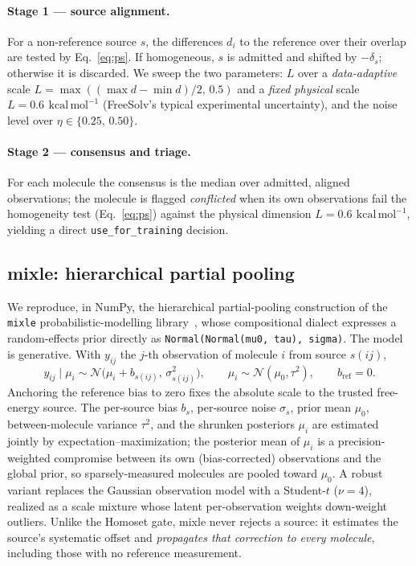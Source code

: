 \documentclass[11pt]{article}
\newcommand{\kcal}{\,\mathrm{kcal\,mol^{-1}}}
\begin{document}
\paragraph{Stage 1 --- source alignment.} For a non-reference source $s$, the differences
$d_i$ to the reference over their overlap are tested by Eq.~\eqref{eq:ps}. If homogeneous, $s$
is admitted and shifted by $-\delta_s$; otherwise it is discarded. We sweep the two parameters:
$L$ over a \emph{data-adaptive} scale $L=\max((\max d-\min d)/2,\,0.5)$ and a \emph{fixed
physical} scale $L=\SI{0.6}{\kcal}$ (FreeSolv's typical experimental uncertainty), and the noise
level over $\eta\in\{0.25,\,0.50\}$.

\paragraph{Stage 2 --- consensus and triage.} For each molecule the consensus is the median
over admitted, aligned observations; the molecule is flagged \emph{conflicted} when its own
observations fail the homogeneity test (Eq.~\eqref{eq:ps}) against the physical dimension
$L=\SI{0.6}{\kcal}$, yielding a direct \texttt{use\_for\_training} decision.

\subsection{mixle: hierarchical partial pooling}
We reproduce, in NumPy, the hierarchical partial-pooling construction of the
\texttt{mixle} probabilistic-modelling library~\cite{mixle}, whose compositional dialect
expresses a random-effects prior directly as \texttt{Normal(Normal(mu0, tau), sigma)}. The
model is generative. With $y_{ij}$ the $j$-th observation of molecule $i$ from
source $s(ij)$,
\begin{equation}
y_{ij} \mid \mu_i \sim \mathcal N\!\big(\mu_i + b_{s(ij)},\, \sigma_{s(ij)}^2\big), \qquad
\mu_i \sim \mathcal N(\mu_0, \tau^2), \qquad b_{\mathrm{ref}} = 0 .
\label{eq:mixle}
\end{equation}
Anchoring the reference bias to zero fixes the absolute scale to the trusted free-energy
source. The per-source bias $b_s$, per-source noise $\sigma_s$, prior mean $\mu_0$, between-molecule
variance $\tau^2$, and the shrunken posteriors $\mu_i$ are estimated jointly by
expectation--maximization; the posterior mean of $\mu_i$ is a precision-weighted compromise
between its own (bias-corrected) observations and the global prior, so sparsely-measured
molecules are pooled toward $\mu_0$. A robust variant replaces the Gaussian observation model
with a Student-$t$ ($\nu=4$), realized as a scale mixture whose latent per-observation weights
down-weight outliers. Unlike the Homoset gate, mixle never rejects a source: it estimates the
source's systematic offset and \emph{propagates that correction to every molecule}, including
those with no reference measurement.
\end{document}
